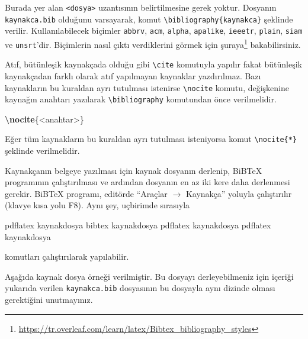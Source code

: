 \documentclass[
  10pt,
]{scrbook}
\newenvironment{Shaded}{}{}
\newcommand{\ExtensionTok}[1]{#1}
\newcommand{\KeywordTok}[1]{\textcolor[rgb]{0.00,0.44,0.13}{\textbf{#1}}}
\newcommand{\NormalTok}[1]{#1}
\renewcommand{\href}[2]{#2\footnote{\url{#1}}}
\theoremstyle{definition}
\theoremstyle{definition}
\theoremstyle{definition}
\theoremstyle{definition}
\theoremstyle{remark}
\begin{document}
Burada yer alan \texttt{\textless{}dosya\textgreater{}} uzantısının belirtilmesine gerek yoktur. Dosyanın \texttt{kaynakca.bib} olduğunu varsayarak, komut \texttt{\textbackslash{}bibliography\{kaynakca\}} şeklinde verilir. Kullanılabilecek biçimler \texttt{abbrv}, \texttt{acm}, \texttt{alpha}, \texttt{apalike}, \texttt{ieeetr}, \texttt{plain}, \texttt{siam} ve \texttt{unsrt}'dir. Biçimlerin nasıl çıktı verdiklerini görmek için \href{https://tr.overleaf.com/learn/latex/Bibtex_bibliography_styles}{şuraya} bakabilirsiniz.

Atıf, bütünleşik kaynakçada olduğu gibi \texttt{\textbackslash{}cite} komutuyla yapılır fakat bütünleşik kaynakçadan farklı olarak atıf yapılmayan kaynaklar yazdırılmaz. Bazı kaynakların bu kuraldan ayrı tutulması istenirse \texttt{\textbackslash{}nocite} komutu, değişkenine kaynağın anahtarı yazılarak \texttt{\textbackslash{}bibliography} komutundan önce verilmelidir.

\begin{Shaded}
\begin{Highlighting}[]
\KeywordTok{\textbackslash{}nocite}\NormalTok{\{}\ExtensionTok{\textless{}anahtar\textgreater{}}\NormalTok{\}}
\end{Highlighting}
\end{Shaded}

Eğer tüm kaynakların bu kuraldan ayrı tutulması isteniyorsa komut \texttt{\textbackslash{}nocite\{*\}} şeklinde verilmelidir.

Kaynakçanın belgeye yazılması için kaynak dosyanın derlenip, BiBTeX programının çalıştırılması ve ardından dosyanın en az iki kere daha derlenmesi gerekir. BiBTeX programı, editörde ``Araçlar \(\rightarrow\) Kaynakça'' yoluyla çalıştırılır (klavye kısa yolu F8). Aynı şey, uçbirimde sırasıyla

\begin{Shaded}
\begin{Highlighting}[]
\ExtensionTok{pdflatex}\NormalTok{ kaynakdosya}
\ExtensionTok{bibtex}\NormalTok{ kaynakdosya}
\ExtensionTok{pdflatex}\NormalTok{ kaynakdosya}
\ExtensionTok{pdflatex}\NormalTok{ kaynakdosya}
\end{Highlighting}
\end{Shaded}

komutları çalıştırılarak yapılabilir.

Aşağıda kaynak dosya örneği verilmiştir. Bu dosyayı derleyebilmeniz için içeriği yukarıda verilen \texttt{kaynakca.bib} dosyasının bu dosyayla aynı dizinde olması gerektiğini unutmayınız.
\end{document}
